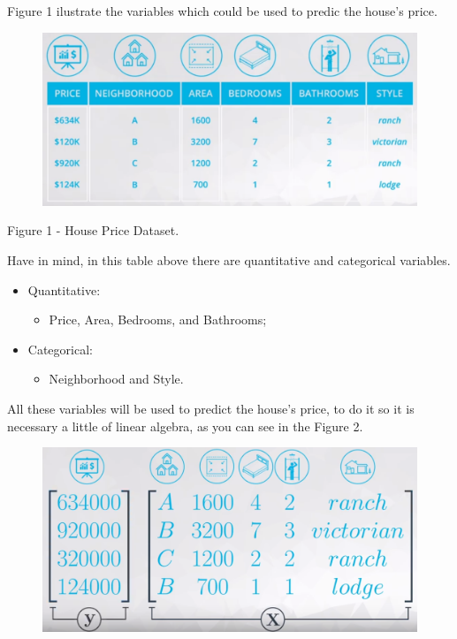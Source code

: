 \documentclass[]{book}
\providecommand{\tightlist}{%
  \setlength{\itemsep}{0pt}\setlength{\parskip}{0pt}}
\begin{document}
Figure 1 ilustrate the variables which could be used to predic the
house's price.

\begin{figure}
\centering
\includegraphics{01-img/c4_l15_01.png}
\caption{}
\end{figure}

Figure 1 - House Price Dataset.

Have in mind, in this table above there are quantitative and categorical
variables.

\begin{itemize}
\tightlist
\item
  Quantitative:

  \begin{itemize}
  \tightlist
  \item
    Price, Area, Bedrooms, and Bathrooms;
  \end{itemize}
\item
  Categorical:

  \begin{itemize}
  \tightlist
  \item
    Neighborhood and Style.
  \end{itemize}
\end{itemize}

All these variables will be used to predict the house's price, to do it
so it is necessary a little of linear algebra, as you can see in the
Figure 2.

\begin{figure}
\centering
\includegraphics{01-img/c4_l15_02.png}
\caption{}
\end{figure}
\end{document}
